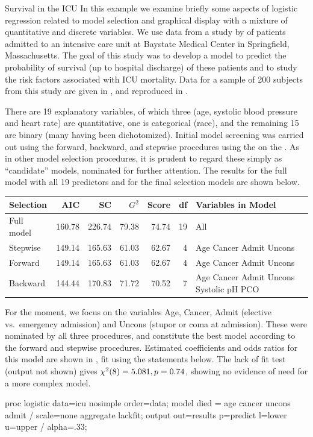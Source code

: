 \begin{Example}[icu1]{Survival in the ICU}
In this example we examine briefly some aspects of logistic regression
related to model selection and graphical display with a mixture of
quantitative and discrete variables.
We use data from a study by
\citet{Lemeshow-etal:88}
of patients admitted to an intensive care unit at
Baystate Medical Center in Springfield,
Massachusetts.  The goal of this study was to develop a
model to predict the probability of survival (up to hospital
discharge) of these patients and to study the risk factors associated with 
ICU mortality.
Data for a sample of 200 subjects from this study are given in
\citet[App. 2]{HosmerLemeshow:89}, and reproduced in
.

There are 19 explanatory variables, of which three (age, systolic blood pressure and heart rate) are quantitative, one is categorical (race),
and the remaining 15 are binary (many having been dichotomized).
Initial model screening was carried out using the forward, backward,
and stepwise procedures using the 
on the .  As in other model selection procedures,
it is prudent to regard these simply as ``candidate'' models,
nominated for further attention. 
The results for the full model with
all 19 predictors and for the final selection models are shown below.

\begin{center}
 \begin{tabular}{l rrrrr p{5.5cm}}
 \hline
  Selection & AIC & SC & $G^2$ & Score & df & Variables in Model \\ 
  \hline
  Full model & 160.78 & 226.74 & 79.38 & 74.74 & 19 & All \\ 
  Stepwise & 149.14 & 165.63 & 61.03 & 62.67 & 4 & Age Cancer Admit Uncons \\ 
  Forward & 149.14 & 165.63 & 61.03 & 62.67 & 4 & Age Cancer Admit Uncons \\ 
  Backward & 144.44 & 170.83 & 71.72 & 70.52 & 7 & Age Cancer Admit Uncons Systolic pH PCO \\ 
 \hline
 \end{tabular}
\end{center}

For the moment, we focus on the variables Age, Cancer, Admit
(elective vs.\ emergency admission) and
Uncons
(stupor or coma at admission).  These were nominated by all three procedures, and 
constitute the best model according to the forward and stepwise
procedures.  Estimated coefficients and odds ratios for this model
are shown in , fit using the statements below.
The lack of fit test (output not shown) gives $\chi^2 (8) = 5.081, p=0.74$,
showing no evidence of need for a more complex model.
\begin{listing}
proc logistic data=icu nosimple order=data;
     model died = age  cancer  uncons admit /
           scale=none aggregate lackfit;
     output out=results p=predict l=lower u=upper / alpha=.33;
\end{listing}


\end{Example}
